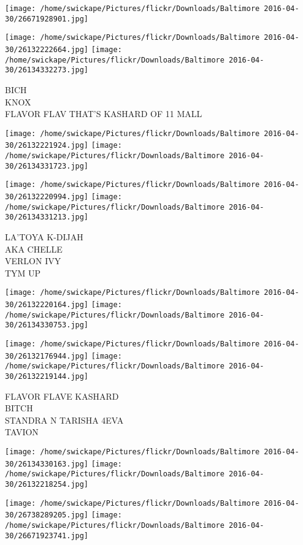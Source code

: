 \documentclass[10pt,letterpaper]{article}
\begin{document}
\texttt{[image: /home/swickape/Pictures/flickr/Downloads/Baltimore 2016-04-30/26671928901.jpg]}

\vspace{0.25in}
\texttt{[image: /home/swickape/Pictures/flickr/Downloads/Baltimore 2016-04-30/26132222664.jpg]}
\texttt{[image: /home/swickape/Pictures/flickr/Downloads/Baltimore 2016-04-30/26134332273.jpg]}

BICH\\
KNOX\\
FLAVOR FLAV THAT'S KASHARD OF 11 MALL
\pagebreak

\texttt{[image: /home/swickape/Pictures/flickr/Downloads/Baltimore 2016-04-30/26132221924.jpg]}
\texttt{[image: /home/swickape/Pictures/flickr/Downloads/Baltimore 2016-04-30/26134331723.jpg]}

\texttt{[image: /home/swickape/Pictures/flickr/Downloads/Baltimore 2016-04-30/26132220994.jpg]}
\texttt{[image: /home/swickape/Pictures/flickr/Downloads/Baltimore 2016-04-30/26134331213.jpg]}

LA'TOYA K{-}DIJAH\\
AKA CHELLE\\
VERLON IVY\\
TYM UP
\pagebreak

\texttt{[image: /home/swickape/Pictures/flickr/Downloads/Baltimore 2016-04-30/26132220164.jpg]}
\texttt{[image: /home/swickape/Pictures/flickr/Downloads/Baltimore 2016-04-30/26134330753.jpg]}

\texttt{[image: /home/swickape/Pictures/flickr/Downloads/Baltimore 2016-04-30/26132176944.jpg]}
\texttt{[image: /home/swickape/Pictures/flickr/Downloads/Baltimore 2016-04-30/26132219144.jpg]}

FLAVOR FLAVE KASHARD\\
BITCH\\
STANDRA N TARISHA 4EVA\\
TAVION
\pagebreak

\texttt{[image: /home/swickape/Pictures/flickr/Downloads/Baltimore 2016-04-30/26134330163.jpg]}
\texttt{[image: /home/swickape/Pictures/flickr/Downloads/Baltimore 2016-04-30/26132218254.jpg]}

\texttt{[image: /home/swickape/Pictures/flickr/Downloads/Baltimore 2016-04-30/26738289205.jpg]}
\texttt{[image: /home/swickape/Pictures/flickr/Downloads/Baltimore 2016-04-30/26671923741.jpg]}
\end{document}
